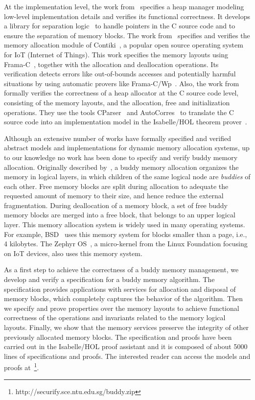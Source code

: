 At the implementation level, the work from~\cite{reg_marti} specifies a heap manager modeling low-level implementation details and verifies its functional correctness. It develops a library for separation logic~\cite{reg_reynolds} to handle pointers in the C source code and to ensure the separation of memory blocks. The work from~\cite{reg_mangano} specifies and verifies the memory allocation module of Contiki~\cite{reg_dunkers}, a popular open source operating system for IoT (Internet of Things). This work specifies the memory layouts using Frama-C~\cite{reg_kirchner}, together with the allocation and deallocation operations. Its verification detects errors like out-of-bounds accesses and potentially harmful situations by using automatic provers like Frama-C/Wp~\cite{reg_allan}. Also, the work from~\cite{reg_sahebolamri} formally verifies the correctness of a heap allocator at the C source code level, consisting of the memory layouts, and the allocation, free and initialization operations. They use the tools CParser~\cite{reg_tuch} and AutoCorres~\cite{reg_greenaway} to translate the C source code into an implementation model in the Isabelle/HOL theorem prover~\cite{reg_Isabelle/HOL}.

Although an extensive number of works have formally specified and verified abstract models and implementations for dynamic memory allocation systems, up to our knowledge no work has been done to specify and verify buddy memory allocation. Originally described by~\cite{reg_knowlton}, a buddy memory allocation organizes the memory in logical layers, in which children of the same logical node are \emph{buddies} of each other. Free memory blocks are split during allocation to adequate the requested amount of memory to their size, and hence reduce the external fragmentation. During deallocation of a memory block, a set of free buddy memory blocks are merged into a free block, that belongs to an upper logical layer. This memory allocation system is widely used in many operating systems. For example, BSD~\cite{reg_mckusick} uses this memory system for blocks smaller than a page, i.e., 4 kilobytes. The Zephyr OS~\cite{reg_zephyr}, a micro-kernel from the Linux Foundation focusing on IoT devices, also uses this memory system.

As a first step to achieve the correctness of a buddy memory management, we develop and verify a specification for a buddy memory algorithm. The specification provides applications with services for allocation and disposal of memory blocks, which completely captures the behavior of the algorithm. Then we specify and prove properties over the memory layouts to achieve functional correctness of the operations and invariants related to the memory logical layouts. Finally, we show that the memory services preserve the integrity of other previously allocated memory blocks. The specification and proofs have been carried out in the Isabelle/HOL proof assistant and it is composed of about 5000 lines of specifications and proofs. The interested reader can access the models and proofs at~\footnote{http://securify.sce.ntu.edu.sg/buddy.zip}.

